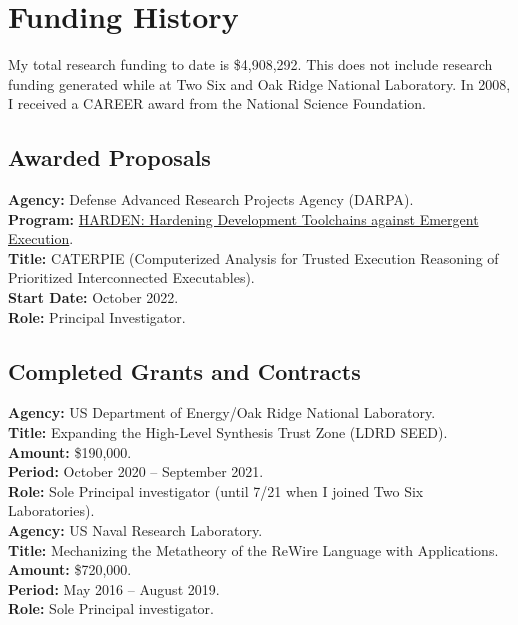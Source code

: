 \documentclass[12pt]{article} %
\begin{document}
\section*{Funding History}

My total research funding to date is \$4,908,292. This does not include research funding generated while at Two Six and Oak Ridge National Laboratory. %
In 2008, I received a CAREER award from the National Science Foundation.

\subsection*{Awarded Proposals}

{\bf Agency:} Defense Advanced Research Projects Agency (DARPA).
\\
{\bf Program:} \href{https://www.darpa.mil/news-events/2021-09-22}{HARDEN: Hardening Development Toolchains against Emergent Execution}.
\\
{\bf Title:} CATERPIE (Computerized Analysis for Trusted Execution Reasoning of Prioritized Interconnected Executables).
\\
{\bf Start Date:} October 2022.
\\
{\bf Role:} Principal Investigator.

\subsection*{Completed Grants and Contracts}

{\bf Agency:} US Department of Energy/Oak Ridge National Laboratory.
\\
{\bf Title:} Expanding the High-Level Synthesis Trust Zone (LDRD SEED).
\\
{\bf Amount:} \$190,000.
\\
{\bf Period:}   October 2020  --  September 2021.
\\
{\bf Role:}    Sole Principal investigator (until 7/21 when I joined Two Six Laboratories).
\\

{\bf Agency:} US Naval Research Laboratory.
\\
{\bf Title:} Mechanizing the Metatheory of the ReWire Language with Applications.
\\
{\bf Amount:} \$720,000.
\\
{\bf Period:}   May 2016  --  August 2019.
\\
{\bf Role:}    Sole  Principal investigator.
\\
\end{document}
